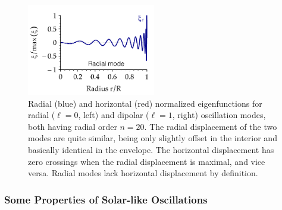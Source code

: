 


\begin{figure}
    \centering
    \includegraphics[width=0.5\textwidth]{figs/pulse/eig-radial.pdf}%
    \caption[Eigenfunctions]{Radial (blue) and horizontal (red) normalized eigenfunctions for radial (${\ell=0}$, left) and dipolar (${\ell=1}$, right) oscillation modes, both having radial order ${n=20}$. 
    The radial displacement of the two modes are quite similar, being only slightly offset in the interior and basically identical in the envelope. 
    The horizontal displacement has zero crossings when the radial displacement is maximal, and vice versa. 
    Radial modes lack horizontal displacement by definition. 
    \label{fig:eigenfunctions}}
\end{figure}



\subsubsection*{Some Properties of Solar-like Oscillations}

